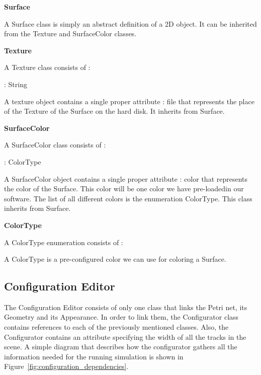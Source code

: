\textbf{Surface}

A Surface class is simply an abstract definition of a 2D object. It can be inherited from the Texture and SurfaceColor classes.

\textbf{Texture}

A Texture class consists of : 
\begin{description}[labelindent=1cm]
  \item[file]: String
\end{description}

A texture object contains a single proper attribute : file that represents the place of the Texture of the Surface on the hard disk. It inherits from Surface.

\textbf{SurfaceColor}

A SurfaceColor class consists of : 
\begin{description}[labelindent=1cm]
  \item[color]: ColorType
\end{description}

A SurfaceColor object contains a single proper attribute : color that represents the color of the Surface. This color will be one color we have pre-loadedin our software. The list of all different colors is the enumeration ColorType. This class inherits from Surface.

\textbf{ColorType}

A ColorType enumeration consists of :
\begin{description}[labelindent=1cm]
  \item[Black]
  \item[Blue]
  \item[Cyan]
  \item[DarkGray]
  \item[Gray]
  \item[Green]
  \item[LightGray]
  \item[Magenta]
  \item[Orange]
  \item[Pink]
  \item[Red]
  \item[White]
  \item[Yellow]
\end{description}

A ColorType is a pre-configured color we can use for coloring a Surface.
 
\subsection{Configuration Editor}
The Configuration Editor consists of only one class that links the Petri net,
its Geometry and its Appearance. In order to link them, the Configurator class
contains references to each of the previously mentioned classes. Also, the Configurator contains an attribute specifying the width of all the tracks in the scene. A simple
diagram that describes how the configurator gathers all the information needed
for the running simulation is shown in Figure~\ref{fig:configuration_dependencies}.

